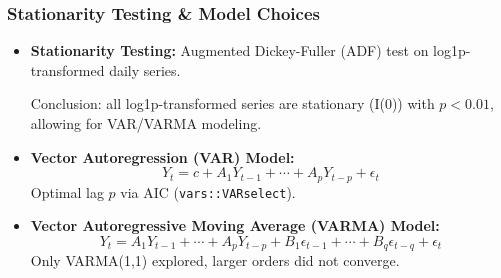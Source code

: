 \documentclass[svgnames, 12pt]{beamer}
\begin{document}
\begin{frame}
    \frametitle{Stationarity Testing \& Model Choices}
    \begin{itemize}
        \item \textbf{Stationarity Testing:} Augmented Dickey-Fuller (ADF) test on log1p-transformed daily series.

        Conclusion: all log1p-transformed series are stationary (I(0)) with $p < 0.01$, allowing for VAR/VARMA modeling.

        \item \textbf{Vector Autoregression (VAR) Model:}
            \[ Y_t = c + A_1 Y_{t-1} + \cdots + A_p Y_{t-p} + \epsilon_t \]
            Optimal lag $p$ via AIC (\texttt{vars::VARselect}).

        \item \textbf{Vector Autoregressive Moving Average (VARMA) Model:}
            \[ Y_t = A_1 Y_{t-1} + \cdots + A_p Y_{t-p} + B_1 \epsilon_{t-1} + \cdots + B_q \epsilon_{t-q} + \epsilon_t \]
            Only VARMA(1,1) explored, larger orders did not converge.
    \end{itemize}
\end{frame}

\end{document}
